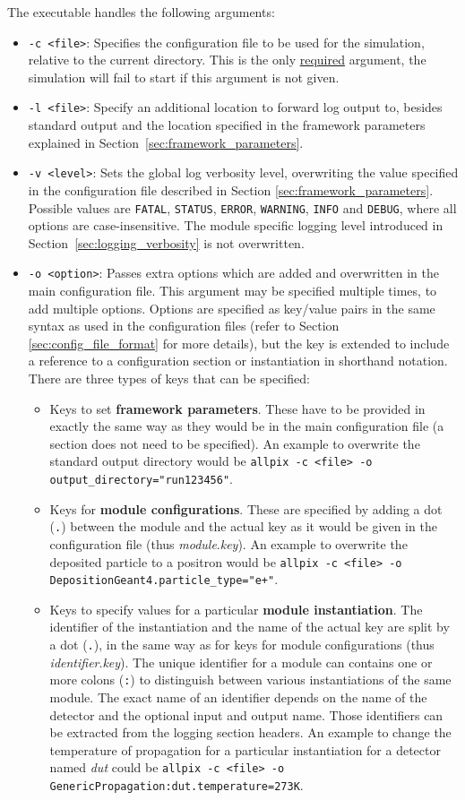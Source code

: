 The executable handles the following arguments:
\begin{itemize}
\item \texttt{-c <file>}: Specifies the configuration file to be used for the simulation, relative to the current directory.
This is the only \underline{required} argument, the simulation will fail to start if this argument is not given.
\item \texttt{-l <file>}: Specify an additional location to forward log output to, besides standard output and the location specified in the framework parameters explained in Section~\ref{sec:framework_parameters}.
\item \texttt{-v <level>}: Sets the global log verbosity level, overwriting the value specified in the configuration file described in Section \ref{sec:framework_parameters}.
Possible values are \texttt{FATAL}, \texttt{STATUS}, \texttt{ERROR}, \texttt{WARNING}, \texttt{INFO} and \texttt{DEBUG}, where all options are case-insensitive.
The module specific logging level introduced in Section~\ref{sec:logging_verbosity} is not overwritten.
\item \texttt{-o <option>}: Passes extra options which are added and overwritten in the main configuration file.
This argument may be specified multiple times, to add multiple options.
Options are specified as key/value pairs in the same syntax as used in the configuration files (refer to Section \ref{sec:config_file_format} for more details), but the key is extended to include a reference to a configuration section or instantiation in shorthand notation.
There are three types of keys that can be specified:
\begin{itemize}
\item Keys to set \textbf{framework parameters}. These have to be provided in exactly the same way as they would be in the main configuration file (a section does not need to be specified). An example to overwrite the standard output directory would be \texttt{allpix -c <file> -o output\_directory="run123456"}.
\item Keys for \textbf{module configurations}. These are specified by adding a dot (\texttt{.}) between the module and the actual key as it would be given in the configuration file (thus \textit{module}.\textit{key}). An example to overwrite the deposited particle to a positron would be \texttt{allpix -c <file> -o DepositionGeant4.particle\_type="e+"}.
\item Keys to specify values for a particular \textbf{module instantiation}. The identifier of the instantiation and the name of the actual key are split by a dot (\texttt{.}), in the same way as for keys for module configurations (thus \textit{identifier}.\textit{key}). The unique identifier for a module can contains one or more colons (\texttt{:}) to distinguish between various instantiations of the same module. The exact name of an identifier depends on the name of the detector and the optional input and output name. Those identifiers can be extracted from the logging section headers. An example to change the temperature of propagation for a particular instantiation for a detector named \textit{dut} could be \texttt{allpix -c <file> -o GenericPropagation:dut.temperature=273K}.

\end{itemize}
\end{itemize}

